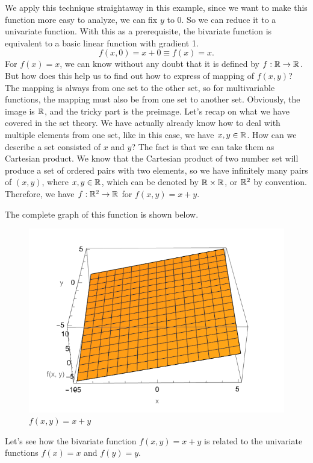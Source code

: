 \begin{example}
\begin{solution}
		We apply this technique straightaway in this example, since we want to make this function more easy to analyze, we can fix $y$ to 0. So we can reduce it
		to a univariate function. With this as a prerequisite, the bivariate function is equivalent to a basic linear function with gradient 1.$$f(x,0) = x + 0 \equiv f(x) = x.$$
		For $f(x) = x$, we can know without any doubt that it is defined by $f: \mathbb{R} \to \mathbb{R}$. But how does this help us to find out how to express of mapping of $f(x,y)$? The mapping is
		always from one set to the other set, so for multivariable functions, the mapping must also be from one set to another set. Obviously, the image is $\mathbb{R}$, and the tricky part
		is the preimage. Let's recap on what we have covered in the set theory. We have actually already know how to deal with multiple elements from one set, like in this case, 
		we have $x, y\in \mathbb{R}$. How can we describe a set consisted of $x$ and $y$? The fact is that we can take them as Cartesian product. We know that the Cartesian product of two number set 
		will produce a set of ordered pairs with two elements, so we have infinitely many pairs of $(x, y)$, where $x, y\in \mathbb{R}$, which can be denoted by $\mathbb{R} \times \mathbb{R}$, or $\mathbb{R}^2$ by convention.
		Therefore, we have $f: \mathbb{R}^2 \to \mathbb{R}$ for $f(x,y)=x+y$.
		\end{solution}
		The complete graph of this function is shown below. 
		\begin{figure}[H]
			\centering
			\includegraphics[width=0.7\linewidth]{Images/x+y}
			\caption{$f(x,y)=x+y$}
			\label{fig:xy}
		\end{figure}
		Let's see how the bivariate function $f(x, y) = x + y$ is related to the univariate functions $f(x) = x$ and $f(y) = y$.
		

\end{example}
